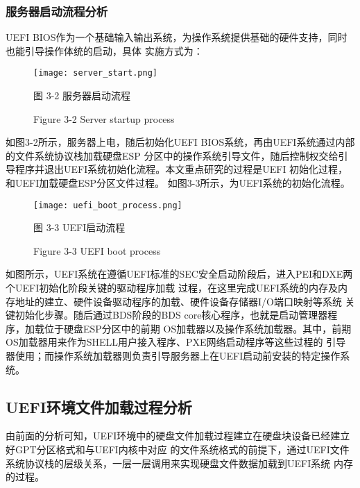 \subsubsection{服务器启动流程分析}
UEFI BIOS作为一个基础输入输出系统，为操作系统提供基础的硬件支持，同时也能引导操作体统的启动，具体
实施方式为：

\begin{figure}[htb]
    \label{ffs_format}
    \vspace{0cm}   
    \setlength{\abovecaptionskip}{0.3cm}  
	\centering
    \texttt{[image: server\_start.png]}
    \caption*{图 3-2 服务器启动流程}
    \setlength{\belowcaptionskip}{-0.7cm}
    \caption*{Figure 3-2 Server startup process}
\end{figure}

如图3-2所示，服务器上电，随后初始化UEFI BIOS系统，再由UEFI系统通过内部的文件系统协议栈加载硬盘ESP
分区中的操作系统引导文件，随后控制权交给引导程序并退出UEFI系统初始化流程。本文重点研究的过程是UEFI
初始化过程，和UEFI加载硬盘ESP分区文件过程。
如图3-3所示，为UEFI系统的初始化流程。

\begin{figure}[htb]
    \label{ffs_format}
    \vspace{0cm}   
    \setlength{\abovecaptionskip}{0.3cm}  
	\centering
    \texttt{[image: uefi\_boot\_process.png]}
    \caption*{图 3-3 UEFI启动流程}
    \setlength{\belowcaptionskip}{-0.7cm}
    \caption*{Figure 3-3 UEFI boot process}
\end{figure}

如图所示，UEFI系统在遵循UEFI标准的SEC安全启动阶段后，进入PEI和DXE两个UEFI初始化阶段关键的驱动程序加载
过程，在这里完成UEFI系统的内存及内存地址的建立、硬件设备驱动程序的加载、硬件设备存储器I/O端口映射等系统
关键初始化步骤。随后通过BDS阶段的BDS core核心程序，也就是启动管理器程序，加载位于硬盘ESP分区中的前期
OS加载器以及操作系统加载器。其中，前期OS加载器用来作为SHELL用户接入程序、PXE网络启动程序等这些过程的
引导器使用；而操作系统加载器则负责引导服务器上在UEFI启动前安装的特定操作系统。

\subsection{UEFI环境文件加载过程分析}
由前面的分析可知，UEFI环境中的硬盘文件加载过程建立在硬盘块设备已经建立好GPT分区格式和与UEFI内核中对应
的文件系统格式的前提下，通过UEFI文件系统协议栈的层级关系，一层一层调用来实现硬盘文件数据加载到UEFI系统
内存的过程。

